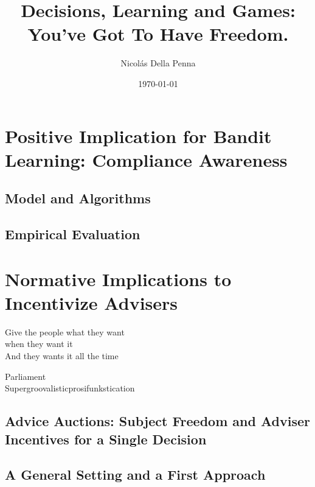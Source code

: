 \documentclass[11pt, a4paper]{book}
\title{Decisions, Learning and Games: \\ You've Got To Have Freedom.}
\author{Nicol\'as Della Penna}
\date{\today}
\begin{document}
\pagestyle{empty}
\thispagestyle{empty}



\cleardoublepage
\pagestyle{empty}


\cleardoublepage
\pagestyle{empty}


\cleardoublepage
\pagestyle{headings}


\cleardoublepage
\pagestyle{headings}
\tableofcontents
\listoffigures
\listoftables

\mainmatter




\part{Positive Implication for Bandit Learning: Compliance Awareness}

\chapter{Model and Algorithms} \label{cha:bandit}





\chapter{Empirical Evaluation} \label{cha:empirical}



\part{Normative Implications to Incentivize Advisers}


\epigraph{Give the people what they want\\ when they want it \\
And they wants it all the time}{Parliament \\ Supergroovalisticprosifunkstication}

\chapter{Advice Auctions: Subject Freedom and Adviser Incentives for a Single Decision} \label{cha:market}


\chapter{A General Setting and a First Approach} \label{cha:twosided}

\end{document}
